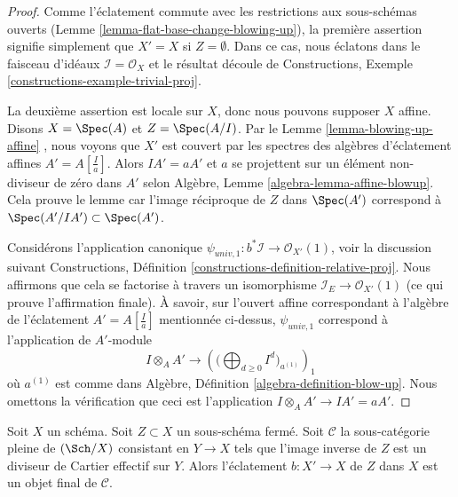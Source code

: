 \begin{proof}
Comme l'éclatement commute avec les restrictions aux sous-schémas ouverts (Lemme
 \ref{lemma-flat-base-change-blowing-up}), la première assertion signifie simplement que  $X' = X$  si
 $Z = \emptyset$. Dans ce cas, nous éclatons dans le faisceau d'idéaux  $\mathcal{I} = \mathcal{O}_X$  et
le résultat découle de Constructions, Exemple  \ref{constructions-example-trivial-proj}.

\medskip\noindent
La deuxième assertion est locale sur  $X$, donc nous pouvons supposer
 $X$  affine. Disons  $X = \Spec(A)$  et  $Z = \Spec(A/I)$. Par le Lemme
 \ref{lemma-blowing-up-affine} , nous voyons que  $X'$  est couvert par les spectres des
algèbres d'éclatement affines  $A' = A[\frac{I}{a}]$. Alors  $IA' = aA'$  et  $a$  se
projettent sur un élément non-diviseur de zéro dans  $A'$  selon Algèbre,
Lemme  \ref{algebra-lemma-affine-blowup}. Cela prouve le lemme car l'image réciproque de  $Z$ 
dans  $\Spec(A')$  correspond à  $\Spec(A'/IA') \subset \Spec(A')$.

\medskip\noindent
Considérons l'application canonique  $\psi_{univ, 1} : b^*\mathcal{I} \to \mathcal{O}_{X'}(1)$, voir la discussion suivant
Constructions, Définition  \ref{constructions-definition-relative-proj}. Nous affirmons que cela se factorise à
travers un isomorphisme  $\mathcal{I}_E \to \mathcal{O}_{X'}(1)$  (ce qui prouve l'affirmation finale). À
savoir, sur l'ouvert affine correspondant à l'algèbre de l'éclatement  $A' = A[\frac{I}{a}]$ 
mentionnée ci-dessus,  $\psi_{univ, 1}$  correspond à l'application de
 $A'$-module
$$
I \otimes_A A'
\longrightarrow
\left(\Big(\bigoplus\nolimits_{d \geq 0} I^d\Big)_{a^{(1)}}\right)_1
$$
où  $a^{(1)}$  est comme dans Algèbre, Définition  \ref{algebra-definition-blow-up}. Nous omettons la
vérification que ceci est l'application  $I \otimes_A A' \to IA' = aA'$.
\end{proof}

\begin{lemma}
\label{lemma-universal-property-blowing-up}
Soit  $X$  un schéma. Soit  $Z \subset X$  un sous-schéma fermé. Soit
 $\mathcal{C}$  la sous-catégorie pleine de  $(\Sch/X)$  consistant en  $Y \to X$ 
tels que l'image inverse de  $Z$  est un diviseur de Cartier effectif sur
 $Y$. Alors l'éclatement  $b : X' \to X$  de  $Z$  dans  $X$ 
est un objet final de  $\mathcal{C}$.
\end{lemma}

